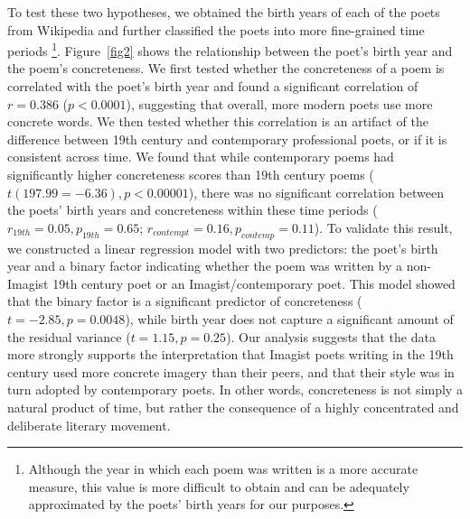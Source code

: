 \documentclass{book}
\begin{document}
To test these two hypotheses, we obtained the birth years of each of the poets from Wikipedia and further classified the poets into more fine-grained time periods \footnote{Although the year in which each poem was written is a more accurate measure, this value is more difficult to obtain and can be adequately approximated by the poets' birth years for our purposes.}. Figure~\ref{fig2} shows the relationship between the poet's birth year and the poem's concreteness. 
%
We first tested whether the concreteness of a poem is correlated with the poet's birth year and found a significant correlation of $r = 0.386$ ($p < 0.0001$), suggesting that overall, more modern poets use more concrete words. We then tested whether this correlation is an artifact of the difference between 19th century and contemporary professional poets, or if it is consistent across time. We found that while contemporary poems had significantly higher concreteness scores than 19th century poems ($t(197.99 = -6.36), p < 0.00001$), there was no significant correlation between the poets' birth years and concreteness within these time periods ($r_{19th} = 0.05, p_{19th} =0.65$; $r_{contempt} = 0.16, p_{contemp} = 0.11$). To validate this result, we constructed a linear regression model with two predictors: the poet's birth year and a binary factor indicating whether the poem was written by a non-Imagist 19th century poet or an Imagist/contemporary poet. This model showed that the binary factor is a significant predictor of concreteness ($t = -2.85, p = 0.0048$), while birth year does not capture a significant amount of the residual variance ($t = 1.15, p= 0.25$). Our analysis suggests that the data more strongly supports the interpretation that Imagist poets writing in the 19th century used more concrete imagery than their peers, and that their style was in turn adopted by contemporary poets. In other words, concreteness is not simply a natural product of time, but rather the consequence of a highly concentrated and deliberate literary movement.


\end{document}
